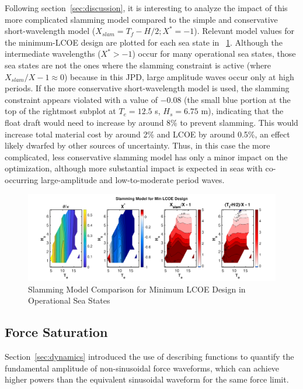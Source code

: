 Following section~\ref{sec:discussion}, it is interesting to analyze the impact of this more complicated slamming model compared to the simple and conservative short-wavelength model ($X_{slam}=T_f-H/2; X^*=-1$).
Relevant model values for the minimum-LCOE design are plotted for each sea state in \figureautorefname~\ref{fig:slamming-validation}.
Although the intermediate wavelengths ($X^*>-1$) occur for many operational sea states, those sea states are not the ones where the slamming constraint is active (where $X_{slam}/X-1 \approx 0$) because in this JPD, large amplitude waves occur only at high periods.
If the more conservative short-wavelength model is used, the slamming constraint appears violated with a value of $-0.08$ (the small blue portion at the top of the rightmost subplot at $T_e=12.5$ s, $H_s=6.75$ m), indicating that the float draft would need to increase by around 8\% to prevent slamming.
This would increase total material cost by around 2\% and LCOE by around 0.5\%, an effect likely dwarfed by other sources of uncertainty.
Thus, in this case the more complicated, less conservative slamming model has only a minor impact on the optimization, although more substantial impact is expected in seas with co-occurring large-amplitude and low-to-moderate period waves. 
\begin{figure}
    \centering
    \includegraphics[width=1\linewidth]{figs/2025-04-11_10.21.55/slam_validation.pdf}
    \caption{Slamming Model Comparison for Minimum LCOE Design in Operational Sea States}
    \label{fig:slamming-validation}
\end{figure}


\clearpage
\subsection{Force Saturation}\label{sec:appendix-force-sat}
Section~\ref{sec:dynamics} introduced the use of describing functions to quantify the fundamental amplitude of non-sinusoidal force waveforms, which can achieve higher powers than the equivalent sinusoidal waveform for the same force limit.

